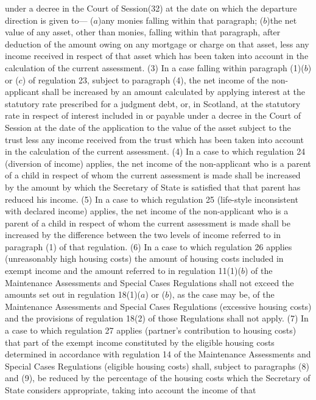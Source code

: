 \documentclass[a4paper]{article}
\begin{document}
under a decree in the Court of Session(32) at the date on which the departure
direction is given to—
($a$)any monies falling within that paragraph;
($b$)the net value of any asset, other than monies, falling within that paragraph,
after deduction of the amount owing on any mortgage or charge on that asset,
less any income received in respect of that asset which has been taken into
account in the calculation of the current assessment.
(3) In a case falling within paragraph (1)($b$) or ($c$) of regulation 23, subject
to paragraph (4), the net income of the non-applicant shall be increased by an
amount calculated by applying interest at the statutory rate prescribed for a
judgment debt, or, in Scotland, at the statutory rate in respect of interest
included in or payable under a decree in the Court of Session at the date of the
application to the value of the asset subject to the trust less any income
received from the trust which has been taken into account in the calculation of
the current assessment.
(4) In a case to which regulation 24 (diversion of income) applies, the net
income of the non-applicant who is a parent of a child in respect of whom the
current assessment is made shall be increased by the amount by which the
Secretary of State is satisfied that that parent has reduced his income.
(5) In a case to which regulation 25 (life-style inconsistent with declared
income) applies, the net income of the non-applicant who is a parent of a child
in respect of whom the current assessment is made shall be increased by the
difference between the two levels of income referred to in paragraph (1) of that
regulation.
(6) In a case to which regulation 26 applies (unreasonably high housing costs)
the amount of housing costs included in exempt income and the amount referred to
in regulation 11(1)($b$) of the Maintenance Assessments and Special Cases
Regulations shall not exceed the amounts set out in regulation 18(1)($a$) or ($b$),
as the case may be, of the Maintenance Assessments and Special Cases Regulations
(excessive housing costs) and the provisions of regulation 18(2) of those
Regulations shall not apply.
(7) In a case to which regulation 27 applies (partner’s contribution to housing
costs) that part of the exempt income constituted by the eligible housing costs
determined in accordance with regulation 14 of the Maintenance Assessments and
Special Cases Regulations (eligible housing costs) shall, subject to paragraphs
(8) and (9), be reduced by the percentage of the housing costs which the
Secretary of State considers appropriate, taking into account the income of that
\end{document}
